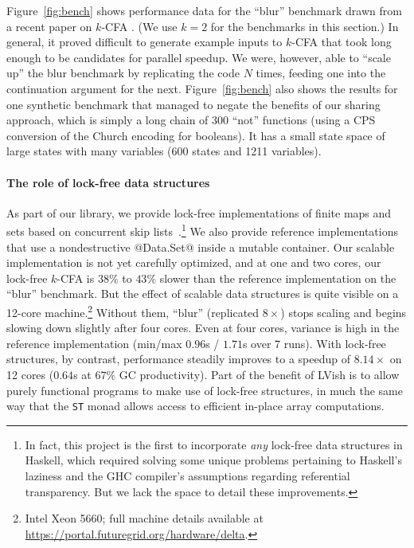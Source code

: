 Figure~\ref{fig:bench} shows performance data for the ``blur'' benchmark drawn
from a recent paper on $k$-CFA \cite{earl-might-icfp-2012}.  (We use $k=2$ for the
benchmarks in this section.)  In general, it proved difficult to generate
example inputs to $k$-CFA that took long enough to be candidates for parallel
speedup.  We were, however, able to ``scale up'' the blur benchmark by
replicating the code $N$ times, feeding one into the continuation argument for
the next.  Figure~\ref{fig:bench} also shows the results for one synthetic benchmark
that managed to negate the
benefits of our sharing approach, which is simply a long chain of $300$ ``not''
functions (using a CPS conversion of the Church encoding for booleans).  It has a small state space of large states with many
variables (600 states and 1211 variables).




\paragraph{The role of lock-free data structures}
As part of our library, we provide lock-free implementations of
finite maps and sets based on concurrent skip lists~\cite{art}.\footnote{In fact,
  this project is the first to incorporate {\em any} lock-free data
  structures in Haskell, which required solving some unique problems
  pertaining to Haskell's laziness and the GHC compiler's
  assumptions regarding referential transparency.  But we lack the space to
  detail these improvements.}  We
also provide reference implementations that use a nondestructive
@Data.Set@ inside a mutable container.
% 
Our scalable implementation is not yet carefully optimized, and at one
and two cores, our lock-free $k$-CFA is $38\%$ to $43\%$ slower than the reference implementation on the ``blur'' benchmark.
%
But the effect of scalable data structures is quite visible on a 12-core
machine.\footnote{Intel Xeon 5660; full machine details available at \url{https://portal.futuregrid.org/hardware/delta}.}
Without them, ``blur'' (replicated $8\times$) stops scaling and begins
slowing down slightly after four cores.  Even at four cores, variance is high in
the reference implementation (min/max $0.96$s / $1.71$s over 7 runs).  With
lock-free structures, by contrast, performance steadily improves to a speedup of
$8.14\times$ on 12 cores ($0.64$s at $67\%$ GC productivity).
Part of the benefit of LVish is to allow purely functional programs to
make use of lock-free structures, in much the same way that the \texttt{ST} monad allows
access to efficient in-place array computations.

